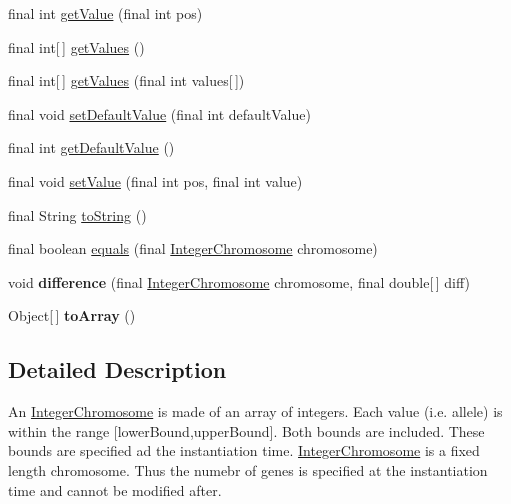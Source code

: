 \begin{DoxyCompactItemize}
\item 
final int \hyperlink{classjenes_1_1chromosome_1_1_integer_chromosome_a5bc96e2224ca980bd9e13e0416426e1d}{get\-Value} (final int pos)
\item 
final int\mbox{[}$\,$\mbox{]} \hyperlink{classjenes_1_1chromosome_1_1_integer_chromosome_aa9e195726837440d8b65c9fc4268624c}{get\-Values} ()
\item 
final int\mbox{[}$\,$\mbox{]} \hyperlink{classjenes_1_1chromosome_1_1_integer_chromosome_adc4af1dfafa5c20d92ee91a79d289317}{get\-Values} (final int values\mbox{[}$\,$\mbox{]})
\item 
final void \hyperlink{classjenes_1_1chromosome_1_1_integer_chromosome_a682f03e84e51f0e132a657b25236d432}{set\-Default\-Value} (final int default\-Value)
\item 
final int \hyperlink{classjenes_1_1chromosome_1_1_integer_chromosome_aac608f3599a9289d510e0ee7bc34fbc9}{get\-Default\-Value} ()
\item 
final void \hyperlink{classjenes_1_1chromosome_1_1_integer_chromosome_a2d2aa7705d11a8ca21493c82bf334f74}{set\-Value} (final int pos, final int value)
\item 
final String \hyperlink{classjenes_1_1chromosome_1_1_integer_chromosome_aac7f634cd0b9449d2db45a87a0773ba3}{to\-String} ()
\item 
final boolean \hyperlink{classjenes_1_1chromosome_1_1_integer_chromosome_a58904190bf6c0d3f3b34dd584dab91b7}{equals} (final \hyperlink{classjenes_1_1chromosome_1_1_integer_chromosome}{Integer\-Chromosome} chromosome)
\item 
\hypertarget{classjenes_1_1chromosome_1_1_integer_chromosome_a69f90fc799f3d0534bc32f6f509f89fc}{void {\bfseries difference} (final \hyperlink{classjenes_1_1chromosome_1_1_integer_chromosome}{Integer\-Chromosome} chromosome, final double\mbox{[}$\,$\mbox{]} diff)}\label{classjenes_1_1chromosome_1_1_integer_chromosome_a69f90fc799f3d0534bc32f6f509f89fc}

\item 
\hypertarget{classjenes_1_1chromosome_1_1_integer_chromosome_ac1fa490d6a64bcd765982f57235fb04a}{Object\mbox{[}$\,$\mbox{]} {\bfseries to\-Array} ()}\label{classjenes_1_1chromosome_1_1_integer_chromosome_ac1fa490d6a64bcd765982f57235fb04a}

\end{DoxyCompactItemize}


\subsection{Detailed Description}
An \hyperlink{classjenes_1_1chromosome_1_1_integer_chromosome}{Integer\-Chromosome} is made of an array of integers. Each value (i.\-e. allele) is within the range \mbox{[}lower\-Bound,upper\-Bound\mbox{]}. Both bounds are included. These bounds are specified ad the instantiation time. \hyperlink{classjenes_1_1chromosome_1_1_integer_chromosome}{Integer\-Chromosome} is a fixed length chromosome. Thus the numebr of genes is specified at the instantiation time and cannot be modified after.

